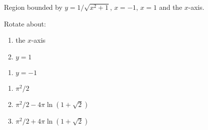 {Region bounded by $y=1/\sqrt{x^2+1}$, $x=-1$, $x=1$ and the $x$-axis.

Rotate about:

\noindent%
\begin{minipage}[t]{.5\linewidth}
\begin{enumerate}
\item		the $x$-axis
\item		$y=1$
\end{enumerate}
\end{minipage}
\begin{minipage}[t]{.5\linewidth}
\begin{enumerate}\addtocounter{enumii}{2}
\item		$y=-1$
\end{enumerate}
\end{minipage}
}
{\begin{enumerate}
\item $\pi^2/2$
\item $\pi^2/2-4\pi\ln\left(1+\sqrt{2}\right)$
\item $\pi^2/2+4\pi\ln\left(1+\sqrt{2}\right)$
\end{enumerate}
}
